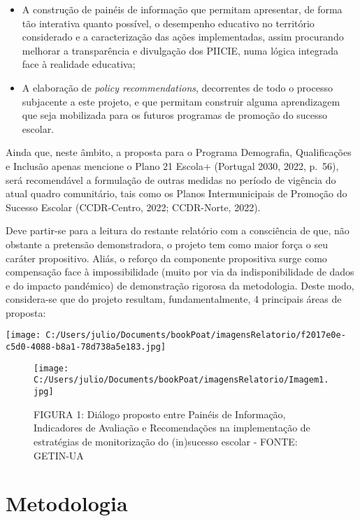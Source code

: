 \documentclass[
]{book}
\providecommand{\tightlist}{%
  \setlength{\itemsep}{0pt}\setlength{\parskip}{0pt}}
\begin{document}
\begin{itemize}
\tightlist
\item
  A construção de painéis de informação que permitam apresentar, de forma tão interativa quanto possível, o desempenho educativo no território considerado e a caracterização das ações implementadas, assim procurando melhorar a transparência e divulgação dos PIICIE, numa lógica integrada face à realidade educativa;
\item
  A elaboração de \emph{policy recommendations}, decorrentes de todo o processo subjacente a este projeto, e que permitam construir alguma aprendizagem que seja mobilizada para os futuros programas de promoção do sucesso escolar.
\end{itemize}

Ainda que, neste âmbito, a proposta para o Programa Demografia, Qualificações e Inclusão apenas mencione o Plano 21 Escola+ (Portugal 2030, 2022, p.~56), será recomendável a formulação de outras medidas no período de vigência do atual quadro comunitário, tais como os Planos Intermunicipais de Promoção do Sucesso Escolar (CCDR-Centro, 2022; CCDR-Norte, 2022).

Deve partir-se para a leitura do restante relatório com a consciência de que, não obstante a pretensão demonstradora, o projeto tem como maior força o seu caráter propositivo. Aliás, o reforço da componente propositiva surge como compensação face à impossibilidade (muito por via da indisponibilidade de dados e do impacto pandémico) de demonstração rigorosa da metodologia. Deste modo, considera-se que do projeto resultam, fundamentalmente, 4 principais áreas de proposta:

\texttt{[image: C:/Users/julio/Documents/bookPoat/imagensRelatorio/f2017e0e-c5d0-4088-b8a1-78d738a5e183.jpg]}

\begin{figure}
\centering
\texttt{[image: C:/Users/julio/Documents/bookPoat/imagensRelatorio/Imagem1.jpg]}
\caption{FIGURA 1: Diálogo proposto entre Painéis de Informação, Indicadores de Avaliação e Recomendações na implementação de estratégias de monitorização do (in)sucesso escolar - FONTE: GETIN-UA}
\end{figure}

\hypertarget{metodologia}{%
\section{Metodologia}\label{metodologia}}
\end{document}

